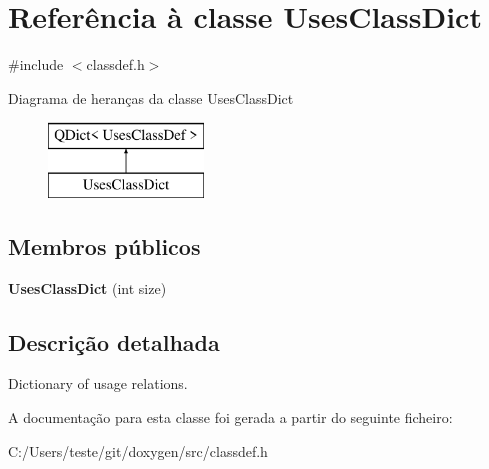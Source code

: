 \hypertarget{class_uses_class_dict}{\section{Referência à classe Uses\-Class\-Dict}
\label{class_uses_class_dict}
}


{\ttfamily \#include $<$classdef.\-h$>$}

Diagrama de heranças da classe Uses\-Class\-Dict\begin{figure}[H]
\begin{center}
\leavevmode
\includegraphics[height=2.000000cm]{class_uses_class_dict}
\end{center}
\end{figure}
\subsection*{Membros públicos}
\begin{DoxyCompactItemize}
\item 
\hypertarget{class_uses_class_dict_a3d7894fec3a4cb4fd7453377868cab9e}{{\bfseries Uses\-Class\-Dict} (int size)}\label{class_uses_class_dict_a3d7894fec3a4cb4fd7453377868cab9e}

\end{DoxyCompactItemize}


\subsection{Descrição detalhada}
Dictionary of usage relations. 

A documentação para esta classe foi gerada a partir do seguinte ficheiro\-:\begin{DoxyCompactItemize}
\item 
C\-:/\-Users/teste/git/doxygen/src/classdef.\-h\end{DoxyCompactItemize}
